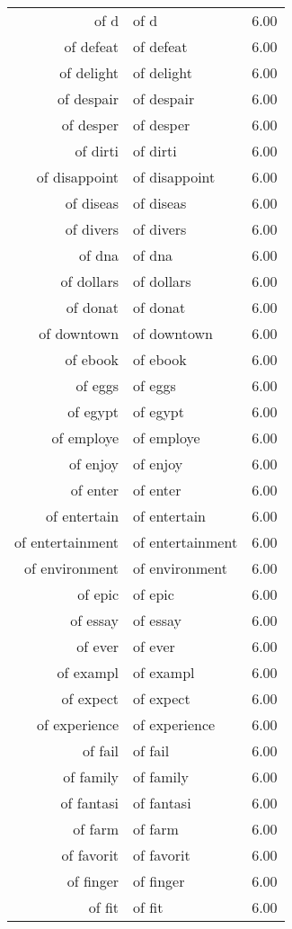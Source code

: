 \begin{table}[ht]
\begin{tabular}{rlr}
  of d & of d & 6.00 \\ 
  of defeat & of defeat & 6.00 \\ 
  of delight & of delight & 6.00 \\ 
  of despair & of despair & 6.00 \\ 
  of desper & of desper & 6.00 \\ 
  of dirti & of dirti & 6.00 \\ 
  of disappoint & of disappoint & 6.00 \\ 
  of diseas & of diseas & 6.00 \\ 
  of divers & of divers & 6.00 \\ 
  of dna & of dna & 6.00 \\ 
  of dollars & of dollars & 6.00 \\ 
  of donat & of donat & 6.00 \\ 
  of downtown & of downtown & 6.00 \\ 
  of ebook & of ebook & 6.00 \\ 
  of eggs & of eggs & 6.00 \\ 
  of egypt & of egypt & 6.00 \\ 
  of employe & of employe & 6.00 \\ 
  of enjoy & of enjoy & 6.00 \\ 
  of enter & of enter & 6.00 \\ 
  of entertain & of entertain & 6.00 \\ 
  of entertainment & of entertainment & 6.00 \\ 
  of environment & of environment & 6.00 \\ 
  of epic & of epic & 6.00 \\ 
  of essay & of essay & 6.00 \\ 
  of ever & of ever & 6.00 \\ 
  of exampl & of exampl & 6.00 \\ 
  of expect & of expect & 6.00 \\ 
  of experience & of experience & 6.00 \\ 
  of fail & of fail & 6.00 \\ 
  of family & of family & 6.00 \\ 
  of fantasi & of fantasi & 6.00 \\ 
  of farm & of farm & 6.00 \\ 
  of favorit & of favorit & 6.00 \\ 
  of finger & of finger & 6.00 \\ 
  of fit & of fit & 6.00 \\ 

\end{tabular}
\end{table}
